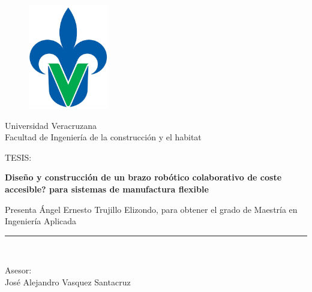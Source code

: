 \begin{titlepage}

\begin{center}
\vspace*{-1in}
\begin{figure}[htb]
\begin{center}
\includegraphics[width=3.5cm]{./img/chapter0/logouv2.jpg}
\end{center}
\end{figure}
\begin{Large}
Universidad Veracruzana
\\
\vspace*{0.15in}
Facultad de Ingeniería de la construcción y el habitat \\
\vspace*{0.6in}
\end{Large}
\begin{large}
TESIS:\\
\end{large}
\vspace*{0.2in}
\begin{Large}
\textbf{Diseño y construcción de un brazo robótico colaborativo de coste accesible? para sistemas de manufactura flexible} \\
\end{Large}
\vspace*{0.3in}
\begin{large}
Presenta Ángel Ernesto Trujillo Elizondo, para obtener el grado de Maestría en Ingeniería Aplicada\\
\end{large}
\vspace*{0.3in}
\rule{80mm}{0.1mm}\\
\vspace*{0.1in}
\begin{large}
Asesor: \\
José Alejandro Vasquez Santacruz \\
\end{large}
\end{center}
\end{titlepage}


